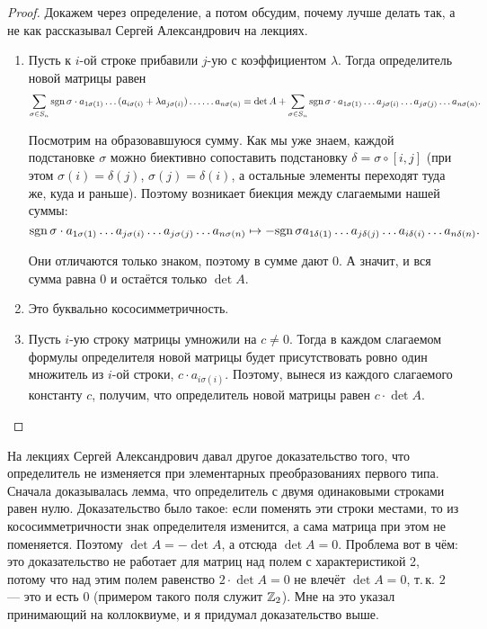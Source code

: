 \begin{proof}
    Докажем через определение, а потом обсудим, почему лучше делать так, а не как рассказывал Сергей Александрович на лекциях.
    \begin{enumerate}
        \item Пусть к $i$-ой строке прибавили $j$-ую с коэффициентом $\lambda$. Тогда определитель новой матрицы равен
            $$
            \sum_{\sigma \in S_n}\mathrm{sgn}\,\sigma \cdot a_{1\sigma(1)} \ldots (a_{i\sigma(i)} + \lambda a_{j\sigma(i)}) \ldots \ldots a_{n\sigma(n)} = \det A + \sum_{\sigma \in S_n}\mathrm{sgn}\,\sigma \cdot a_{1\sigma(1)} \ldots a_{j\sigma(i)} \ldots a_{j\sigma(j)} \ldots a_{n\sigma(n)}.
            $$

            Посмотрим на образовавшуюся сумму. Как мы уже знаем, каждой подстановке $\sigma$ можно биективно сопоставить подстановку $\delta = \sigma \circ [i, j]$ (при этом $\sigma(i) = \delta(j)$, $\sigma(j) = \delta(i)$, а остальные элементы переходят туда же, куда и раньше). Поэтому возникает биекция между слагаемыми нашей суммы:
            $$
            \mathrm{sgn}\,\sigma \cdot a_{1\sigma(1)} \ldots a_{j\sigma(i)} \ldots a_{j\sigma(j)} \ldots a_{n\sigma(n)} \mapsto -\mathrm{sgn}\,\sigma a_{1\delta(1)} \ldots a_{j\delta(j)} \ldots a_{i\delta(i)} \ldots a_{n\delta(n)}.
            $$

            Они отличаются только знаком, поэтому в сумме дают $0$. А значит, и вся сумма равна $0$ и остаётся только $\det A$.

        \item Это буквально кососимметричность.
        \item Пусть $i$-ую строку матрицы умножили на $c \ne 0$. Тогда в каждом слагаемом формулы определителя новой матрицы будет присутствовать ровно один множитель из $i$-ой строки, $c \cdot a_{i\sigma(i)}$. Поэтому, вынеся из каждого слагаемого константу $c$, получим, что определитель новой матрицы равен $c \cdot \det A$.
    \end{enumerate}
\end{proof}

\begin{remark}
    На лекциях Сергей Александрович давал другое доказательство того, что определитель не изменяется при элементарных преобразованиях первого типа. Сначала доказывалась лемма, что определитель с двумя одинаковыми строками равен нулю. Доказательство было такое: если поменять эти строки местами, то из кососимметричности знак определителя изменится, а сама матрица при этом не поменяется. Поэтому $\det A = -\det A$, а отсюда $\det A = 0$. Проблема вот в чём: это доказательство не работает для матриц над полем с характеристикой 2, потому что над этим полем равенство $2 \cdot \det A = 0$ не влечёт $\det A = 0$, т.\,к. $2$ --- это и есть $0$ (примером такого поля служит $\mathbb{Z}_2$). Мне на это указал принимающий на коллоквиуме, и я придумал доказательство выше.
\end{remark}

